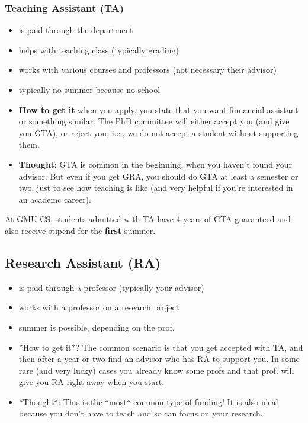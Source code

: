 \documentclass[10pt]{article}
\begin{document}
\subsubsection{Teaching Assistant (TA)}
\begin{itemize}
\item is paid through the department
\item helps with teaching class (typically grading)
\item works with various courses and professors (not necessary their advisor)
\item typically no summer because no school
\item \textbf{How to get it}  when you apply, you state that you want finnancial assistant or something similar. The PhD committee will either accept you (and give you GTA), or reject you; i.e., we do not accept a student without supporting them.
\item \textbf{Thought}: GTA is common in the beginning, when you haven't found your advisor.  But even if you get GRA, you should do GTA at least a semester or two, just to see how teaching is like (and very helpful if you're interested in an academc career).
\end{itemize}

\begin{tcolorbox}[left=1pt,right=1pt,top=1pt,bottom=1pt]
At GMU CS, students admitted with TA have  4 years of GTA guaranteed and also receive  stipend for the \textbf{first} summer.
\end{tcolorbox}

\subsection{Research Assistant (RA)}
\begin{itemize}
\item is paid through a professor (typically your advisor)
\item works with a professor on a research project
\item summer is possible, depending on the prof.
\item *How to get it*?  The common scenario is that you get accepted with TA, and then after a year or two find an advisor who has RA to support you. In some rare (and very lucky) cases you already know some profs  and that prof. will give you RA right away when you start.
\item *Thought*: This is the *most* common type of funding!  It is also ideal because you don't have to teach and so can focus on your research.
\end{itemize}
\end{document}
